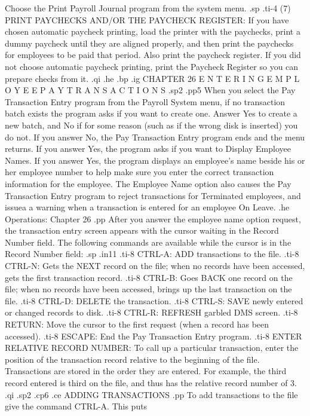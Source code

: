Choose the Print Payroll Journal program from the system menu.
.sp
.ti-4
(7) PRINT PAYCHECKS AND/OR THE PAYCHECK REGISTER: If you have chosen
automatic paycheck printing, load the printer with the paychecks, print
a dummy paycheck until they are aligned properly, and then print the
paychecks for employees to be paid that period.  Also print the
paycheck register.  If you did not choose automatic paycheck printing,
print the Paycheck Register so you can prepare checks
from it.
.qi
.he
.bp
.ig
CHAPTER 26
E N T E R I N G    E M P L O Y E E    P A Y
T R A N S A C T I O N S
.sp2
.pp5
When you select the Pay Transaction Entry program from the Payroll
System menu, if no transaction batch exists the program asks
if you want to create one.  Answer Yes to create a new batch, and
No if for some reason (such as if the wrong disk is inserted)
you do not.  If you answer No, the Pay Transaction Entry program ends
and the menu returns. If you answer Yes, the program asks if
you want to Display Employee Names.  If you answer Yes, the
program displays an employee's name beside his or her  employee number
to help make sure you enter the correct transaction information
for the employee.  The Employee Name option also causes the Pay
Transaction Entry program to reject transactions
for Terminated employees, and issuea a warning when a transaction is
entered for an employee On Leave.
.he Operations: Chapter 26
.pp
After you answer the employee name option request, the transaction
entry screen appears with the cursor waiting in the Record Number
field.	The following commands are available while the cursor
is in the Record Number field:
.sp
.in11
.ti-8
CTRL-A: ADD transactions to the file.
.ti-8
CTRL-N: Gets the NEXT record on the file; when no records have been
accessed, gets the first transaction record.
.ti-8
CTRL-B: Goes BACK one record on the file; when no records have been
accessed, brings up the last transaction on the file.
.ti-8
CTRL-D: DELETE the transaction.
.ti-8
CTRL-S: SAVE newly entered or changed records to disk.
.ti-8
CTRL-R: REFRESH garbled DMS screen.
.ti-8
RETURN: Move the cursor to the first request
(when a record has been accessed).
.ti-8
ESCAPE: End the Pay Transaction Entry program.
.ti-8
ENTER RELATIVE RECORD NUMBER: To call up a particular transaction,
enter the position of the transaction record relative to the beginning
of the file. Transactions are stored in the order they are entered.
For example, the third record entered is third on the file, and thus
has the relative record number of 3.
.qi
.sp2
.cp6
.ce
ADDING TRANSACTIONS
.pp
To add transactions to the file give the command CTRL-A.  This puts

